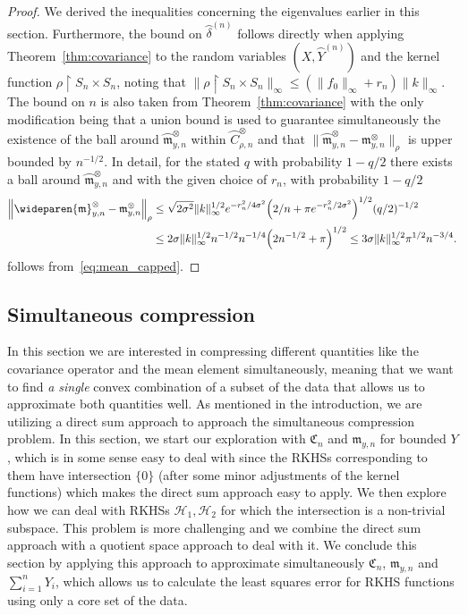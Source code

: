 \documentclass[AHL,Unicode,longabstracts,published]{cedram}
\theoremstyle{remark}
\newcommand{\restrr}
{\!\!\upharpoonright\!\!}
\newcommand{\cH}{\mathcal{H}}
\newcommand{\fkC}{\mathfrak{C}}
\newcommand{\mean}{\mathfrak{m}}
\let\originalleft\left
\let\originalright\right
\renewcommand{\left}{\mathopen{}\mathclose\bgroup\originalleft}
\renewcommand{\right}{\aftergroup\egroup\originalright}
\begin{document}
\begin{proof}
We derived the inequalities concerning the eigenvalues earlier in this section. Furthermore, the bound on $\wideparen{\delta}^{(n)}$ follows directly when applying Theorem~\ref{thm:covariance} to the random variables $(X,\wideparen{Y}^{(n)})$ and the kernel function $\rho\restrr S_n \times S_n$, noting that $\|\rho\restrr S_n \times S_n\|_\infty \leq (\|f_0\|_\infty + r_n) \|k\|_\infty $. The bound on $n$ is also taken from Theorem~\ref{thm:covariance} with the only modification being that a union bound is used to guarantee simultaneously the existence of the ball around $\wideparen{\mean}^\otimes_{y,n}$ within $\wideparen{C}^{\otimes}_{\rho,n}$ and that $\|\wideparen{\mean}^\otimes_{y,n} - \mean_{y,n}^\otimes \|_\rho$ is upper bounded by $n^{-1/2}$. In detail, for the stated $q$ with probability $1- q/2$ there exists a ball around $ \wideparen{\mean}^\otimes_{y,n}$ and with the given choice of $r_n$, with probability $1- q/2$
\begin{align*}
\left\|\wideparen{\mean}^\otimes_{y,n} - \mean_{y,n}^\otimes \right\|_\rho &\leq \sqrt{2 \sigma^2} \|k\|^{1/2}_\infty e^{-r_n^2/4 \sigma^2} \Bigl(2/n + \pi e^{-r_n^2/2 \sigma^2} \Bigr)^{1/2} (q/2)^{-1/2} \\
&\leq 2 \sigma \|k\|^{1/2}_\infty n^{-1/2} n^{-1/4} \left(2 n^{-1/2} + \pi\right)^{1/2} \leq 3 \sigma \|k\|_\infty^{1/2} \pi^{1/2} n^{-3/4}.
\end{align*}
follows from~\eqref{eq:mean_capped}.
\end{proof}



\subsection{Simultaneous compression} \label{sec:simultaneous}
In this section we are interested in compressing different quantities like the covariance operator and the mean element simultaneously, meaning that we want to find \emph{a single} convex combination of a subset of the data that allows us to approximate both quantities well. As mentioned in the introduction, we are utilizing a direct sum approach to approach the simultaneous compression problem. In this section, we start our exploration with $\fkC_n$ and $\mean_{y,n}$ for bounded $Y$, which is in some sense easy to deal with since the RKHSs corresponding to them have intersection $\{0\}$ (after some minor adjustments of the kernel functions) which makes the direct sum approach easy to apply. We then explore how we can deal with RKHSs $\cH_1,\cH_2$ for which the intersection is a non-trivial subspace. This problem is more challenging and we combine the direct sum approach with a quotient space approach to deal with it. We conclude this section by applying this approach to approximate simultaneously $\fkC_n$, $\mean_{y,n}$ and $\sum_{i=1}^n Y_i$, which allows us to calculate the least squares error for RKHS functions using only a core set of the data.
\end{document}
